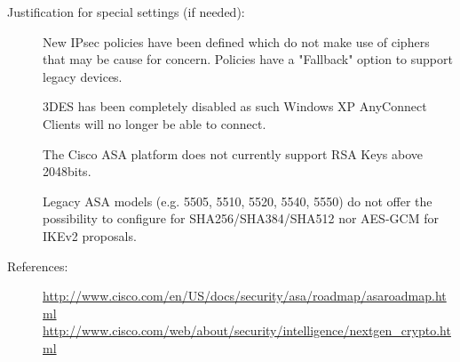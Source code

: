 \begin{description}
\item[Justification for special settings (if needed):] \mbox{}
New IPsec policies have been defined which do not make use of ciphers that may be cause for concern. Policies have a "Fallback" option to support legacy devices.

3DES has been completely disabled as such Windows XP AnyConnect Clients will no longer be able to connect.

The Cisco ASA platform does not currently support RSA Keys above 2048bits.

Legacy ASA models (e.g. 5505, 5510, 5520, 5540, 5550) do not offer the possibility to configure for SHA256/SHA384/SHA512 nor AES-GCM for IKEv2 proposals.

\item[References:] 
\url{http://www.cisco.com/en/US/docs/security/asa/roadmap/asaroadmap.html}\\
\url{http://www.cisco.com/web/about/security/intelligence/nextgen_crypto.html}



\end{description}

















